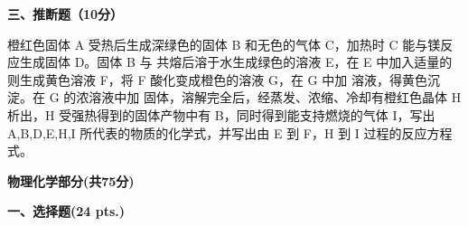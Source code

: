\vspace{0.5cm}
\noindent\textbf{三、推断题（10分）}

橙红色固体 A 受热后生成深绿色的固体 B 和无色的气体 C，加热时 C 能与镁反应生成固体 D。固体 B 与  共熔后溶于水生成绿色的溶液 E，在 E 中加入适量的  则生成黄色溶液 F，将 F 酸化变成橙色的溶液 G，在 G 中加  溶液，得黄色沉淀。在 G 的浓溶液中加  固体，溶解完全后，经蒸发、浓缩、冷却有橙红色晶体 H 析出，H 受强热得到的固体产物中有 B，同时得到能支持燃烧的气体 I，写出 A,B,D,E,H,I 所代表的物质的化学式，并写出由 E 到 F，H 到 I 过程的反应方程式。

\vspace{1cm}
\begin{center}
    {\Large \textbf{物理化学部分(共75分)}}
\end{center}

\vspace{0.5cm}
\noindent\textbf{一、选择题(24 pts.)}

